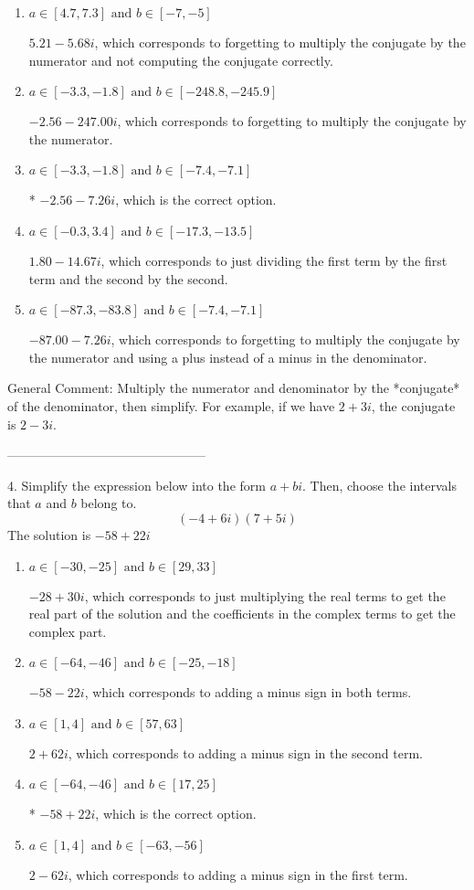 \documentclass{extbook}[14pt]
\begin{document}
\begin{enumerate}[label=\Alph*.] 
\item $ a \in [4.7, 7.3] \text{ and } b \in [-7, -5] $ 

  $5.21  - 5.68 i$, which corresponds to forgetting to multiply the conjugate by the numerator and not computing the conjugate correctly. 
\item $ a \in [-3.3, -1.8] \text{ and } b \in [-248.8, -245.9] $ 

  $-2.56  - 247.00 i$, which corresponds to forgetting to multiply the conjugate by the numerator. 
\item $ a \in [-3.3, -1.8] \text{ and } b \in [-7.4, -7.1] $ 

 * $-2.56  - 7.26 i$, which is the correct option. 
\item $ a \in [-0.3, 3.4] \text{ and } b \in [-17.3, -13.5] $ 

  $1.80  - 14.67 i$, which corresponds to just dividing the first term by the first term and the second by the second. 
\item $ a \in [-87.3, -83.8] \text{ and } b \in [-7.4, -7.1] $ 

  $-87.00  - 7.26 i$, which corresponds to forgetting to multiply the conjugate by the numerator and using a plus instead of a minus in the denominator. 
\end{enumerate} 
 
General Comment: Multiply the numerator and denominator by the *conjugate* of the denominator, then simplify. For example, if we have $2+3i$, the conjugate is $2-3i$.

-----------------------------------------------

4. Simplify the expression below into the form $a+bi$. Then, choose the intervals that $a$ and $b$ belong to.
\[ (-4  + 6 i)(7  + 5 i) \] 
The solution is $ -58  + 22 i $ 

\begin{enumerate}[label=\Alph*.] 
\item $ a \in [-30, -25] \text{ and } b \in [29, 33] $ 

  $-28  + 30 i$, which corresponds to just multiplying the real terms to get the real part of the solution and the coefficients in the complex terms to get the complex part. 
\item $ a \in [-64, -46] \text{ and } b \in [-25, -18] $ 

  $-58  - 22 i$, which corresponds to adding a minus sign in both terms. 
\item $ a \in [1, 4] \text{ and } b \in [57, 63] $ 

  $2  + 62 i$, which corresponds to adding a minus sign in the second term. 
\item $ a \in [-64, -46] \text{ and } b \in [17, 25] $ 

 * $-58  + 22 i$, which is the correct option. 
\item $ a \in [1, 4] \text{ and } b \in [-63, -56] $ 

  $2  - 62 i$, which corresponds to adding a minus sign in the first term. 
\end{enumerate} 
 
\end{document}
